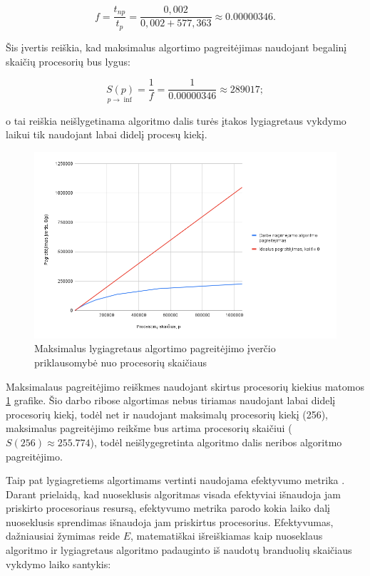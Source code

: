 \documentclass{VUMIFPSbakalaurinis}
\begin{document}
\[ f = \frac{t_{np}}{t_p} = \frac{0,002}{0,002+577,363} \approx 0.00000346 .\]

Šis įvertis reiškia, kad maksimalus algortimo pagreitėjimas naudojant begalinį skaičių procesorių bus lygus:

\[ \underset{p \rightarrow \inf}{S(p)} = \frac{1}{f} = \frac{1}{0.00000346} \approx 289017  ;\]

o tai reiškia neišlygetinama algoritmo dalis turės įtakos lygiagretaus vykdymo laikui tik naudojant labai didelį procesų kiekį.

\begin{figure}[H]
    \centering
    \includegraphics[scale=0.5]{img/max_speedup.png}
    \caption{Maksimalus lygiagretaus algortimo pagreitėjimo įverčio priklausomybė nuo procesorių skaičiaus}
    \label{img:max_speedup}
\end{figure}

Maksimalaus pagreitėjimo reiškmes naudojant skirtus procesorių kiekius matomos \ref{img:max_speedup} grafike.
Šio darbo ribose algortimas nebus tiriamas naudojant labai didelį procesorių kiekį, todėl net ir naudojant maksimalų procesorių kiekį (256),
maksimalus pagreitėjimo reikšme bus artima procesorių skaičiui ($S(256) \approx 255.774$), todėl neišlygegretinta algoritmo dalis neribos algoritmo pagreitėjimo.  

Taip pat lygiagretiems algortimams vertinti naudojama efektyvumo metrika \cite{eager1989speedup}.
Darant prielaidą, kad nuoseklusis algoritmas visada efektyviai išnaudoja jam priskirto procesoriaus resursą, efektyvumo metrika parodo kokia laiko dalį nuoseklusis sprendimas išnaudoja jam priskirtus procesorius.
Efektyvumas, dažniausiai žymimas reide $E$, matematiškai išreiškiamas kaip nuoseklaus algoritmo ir lygiagretaus algoritmo padauginto iš naudotų branduolių skaičiaus vykdymo laiko santykis:
\end{document}
